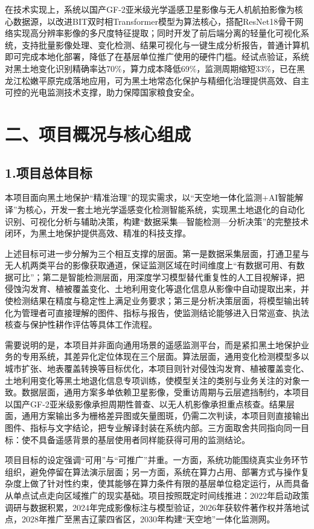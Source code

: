 \documentclass[12pt, a4paper]{ctexart}
\begin{document}
在技术实现上，系统以国产GF-2亚米级光学遥感卫星影像与无人机航拍影像为核心数据源，以改进BIT双时相Transformer模型为算法核心，搭配ResNet18骨干网络实现高分辨率影像的多尺度特征提取；同时开发了前后端分离的轻量化可视化系统，支持批量影像处理、变化检测、结果可视化与一键生成分析报告，普通计算机即可完成本地化部署，降低了在基层单位推广使用的硬件门槛。经试点验证，系统对黑土地变化识别精确率达70\%，算力成本降低69\%，监测周期缩短33\%，已在黑龙江松嫩平原完成落地应用，可为黑土地常态化保护与精细化治理提供高效、自主可控的光电监测技术支撑，助力保障国家粮食安全。

\section{二、项目概况与核心组成}

\subsection{1.项目总体目标}

本项目面向黑土地保护“精准治理”的现实需求，以“天空地一体化监测+AI智能解译”为核心，开发一套土地光学遥感变化检测智能系统，实现黑土地退化的自动化识别、可视化分析与辅助决策，构建“数据采集—智能检测—分析决策”的完整技术闭环，为黑土地保护提供高效、精准的科技支撑。

上述目标可进一步分解为三个相互支撑的层面。第一是数据采集层面，打通卫星与无人机两类平台的影像获取通道，保证监测区域在时间维度上“有数据可用、有数据可比”；第二是智能检测层面，用深度学习模型替代重复性的人工目视解译，把侵蚀沟发育、植被覆盖变化、土地利用变化等退化信息从影像中自动提取出来，并使检测结果在精度与稳定性上满足业务要求；第三是分析决策层面，将模型输出转化为管理者可直接理解的图件、指标与报告，使监测结论能够进入日常巡查、执法核查与保护性耕作评估等具体工作流程。

需要说明的是，本项目并非面向通用场景的遥感监测平台，而是紧扣黑土地保护业务的专用系统，其差异化定位体现在三个层面。算法层面，通用变化检测模型多以城市扩张、地表覆盖转换等目标优化，本项目则针对侵蚀沟发育、植被覆盖变化、土地利用变化等黑土地退化信息专项训练，使模型关注的类别与业务关注的对象一致。数据层面，通用方案多单依赖卫星影像，受重访周期与云层遮挡制约，本项目以国产GF-2亚米级影像承担周期性普查、以无人机影像承担重点核查。结果层面，通用方案输出多为栅格差异图或矢量图斑，仍需二次判读，本项目则直接输出图件、指标与文字结论，把专业解译封装在系统内部。三方面取舍共同指向同一目标：使不具备遥感背景的基层使用者同样能获得可用的监测结论。

项目目标的设定强调“可用”与“可推广”并重。一方面，系统功能围绕真实业务环节组织，避免停留在算法演示层面；另一方面，系统在算力占用、部署方式与操作复杂度上做了针对性约束，使其能够在算力条件有限的基层单位稳定运行，从而具备从单点试点走向区域推广的现实基础。项目按照既定时间线推进：2022年启动政策调研与数据积累，2024年完成影像标注与模型验证，2026年获软件著作权并落地试点，2028年推广至黑吉辽蒙四省区，2030年构建“天空地”一体化监测网。
\end{document}
